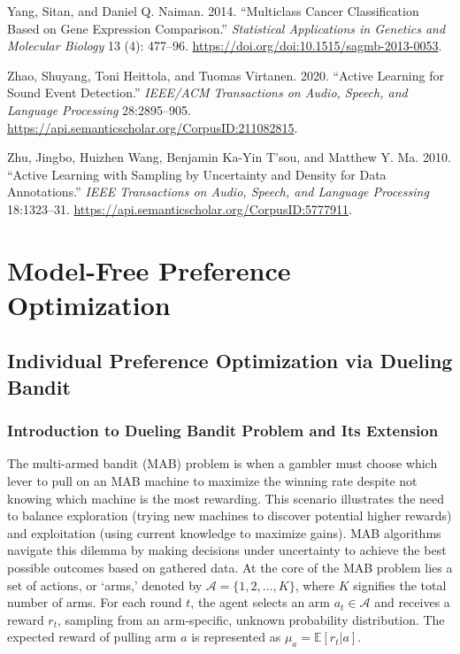 \documentclass[
  letterpaper,
  DIV=11,
  numbers=noendperiod,
  oneside]{scrreprt}
\newlength{\cslhangindent}
\newenvironment{CSLReferences}[2] %
 {\begin{list}{}{%
  \setlength{\itemindent}{0pt}
  \setlength{\leftmargin}{0pt}
  \setlength{\parsep}{0pt}
  \ifodd #1
   \setlength{\leftmargin}{\cslhangindent}
   \setlength{\itemindent}{-1\cslhangindent}
  \fi
  \setlength{\itemsep}{#2\baselineskip}}}
 {\end{list}}
\let\oldchapter\chapter
\def\chapter{%
  \setcounter{sidenote}{1}%
  \oldchapter
}
\theoremstyle{remark}
\begin{document}
\begin{CSLReferences}{1}{0}
Yang, Sitan, and Daniel Q. Naiman. 2014. {``Multiclass Cancer
Classification Based on Gene Expression Comparison.''} \emph{Statistical
Applications in Genetics and Molecular Biology} 13 (4): 477--96.
\url{https://doi.org/doi:10.1515/sagmb-2013-0053}.

Zhao, Shuyang, Toni Heittola, and Tuomas Virtanen. 2020. {``Active
Learning for Sound Event Detection.''} \emph{IEEE/ACM Transactions on
Audio, Speech, and Language Processing} 28:2895--905.
\url{https://api.semanticscholar.org/CorpusID:211082815}.

Zhu, Jingbo, Huizhen Wang, Benjamin Ka-Yin T'sou, and Matthew Y. Ma.
2010. {``Active Learning with Sampling by Uncertainty and Density for
Data Annotations.''} \emph{IEEE Transactions on Audio, Speech, and
Language Processing} 18:1323--31.
\url{https://api.semanticscholar.org/CorpusID:5777911}.

\end{CSLReferences}


\chapter{Model-Free Preference Optimization}\label{4optim}

\section{Individual Preference Optimization via Dueling
Bandit}\label{individual-preference-optimization-via-dueling-bandit}

\subsection{Introduction to Dueling Bandit Problem and Its
Extension}\label{introduction-to-dueling-bandit-problem-and-its-extension}

The multi-armed bandit (MAB) problem is when a gambler must choose which
lever to pull on an MAB machine to maximize the winning rate despite not
knowing which machine is the most rewarding. This scenario illustrates
the need to balance exploration (trying new machines to discover
potential higher rewards) and exploitation (using current knowledge to
maximize gains). MAB algorithms navigate this dilemma by making
decisions under uncertainty to achieve the best possible outcomes based
on gathered data. At the core of the MAB problem lies a set of actions,
or `arms,' denoted by \(\mathcal{A} = \{1, 2, \ldots, K\}\), where \(K\)
signifies the total number of arms. For each round \(t\), the agent
selects an arm \(a_t \in \mathcal{A}\) and receives a reward \(r_t\),
sampling from an arm-specific, unknown probability distribution. The
expected reward of pulling arm \(a\) is represented as
\(\mu_a = \mathbb{E}[r_t | a]\).
\end{document}
